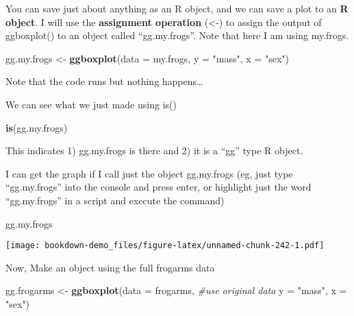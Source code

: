 \documentclass[]{book}
\newenvironment{Shaded}{\begin{snugshade}}{\end{snugshade}}
\newcommand{\KeywordTok}[1]{\textcolor[rgb]{0.13,0.29,0.53}{\textbf{#1}}}
\newcommand{\DataTypeTok}[1]{\textcolor[rgb]{0.13,0.29,0.53}{#1}}
\newcommand{\StringTok}[1]{\textcolor[rgb]{0.31,0.60,0.02}{#1}}
\newcommand{\CommentTok}[1]{\textcolor[rgb]{0.56,0.35,0.01}{\textit{#1}}}
\newcommand{\NormalTok}[1]{#1}
\theoremstyle{definition}
\theoremstyle{definition}
\theoremstyle{definition}
\theoremstyle{remark}
\begin{document}
You can save just about anything as an R object, and we can save a plot
to an \textbf{R object}. I will use the \textbf{assignment operation}
(\textless{}-) to assign the output of ggboxplot() to an object called
``gg.my.frogs''. Note that here I am using my.frogs.

\begin{Shaded}
\begin{Highlighting}[]
\NormalTok{gg.my.frogs <-}\StringTok{ }\KeywordTok{ggboxplot}\NormalTok{(}\DataTypeTok{data =}\NormalTok{ my.frogs,}
          \DataTypeTok{y =} \StringTok{"mass"}\NormalTok{,}
          \DataTypeTok{x =} \StringTok{"sex"}\NormalTok{)}
\end{Highlighting}
\end{Shaded}

Note that the code runs but nothing happens\ldots{}

We can see what we just made using is()

\begin{Shaded}
\begin{Highlighting}[]
\KeywordTok{is}\NormalTok{(gg.my.frogs)}
\end{Highlighting}
\end{Shaded}

This indicates 1) gg.my.frogs is there and 2) it is a ``gg'' type R
object.

I can get the graph if I call just the object gg.my.frogs (eg, just type
``gg.my.frogs'' into the console and press enter, or highlight just the
word ``gg.my.frogs'' in a script and execute the command)

\begin{Shaded}
\begin{Highlighting}[]
\NormalTok{gg.my.frogs}
\end{Highlighting}
\end{Shaded}

\texttt{[image: bookdown-demo\_files/figure-latex/unnamed-chunk-242-1.pdf]}

Now, Make an object using the full frogarms data

\begin{Shaded}
\begin{Highlighting}[]
\NormalTok{gg.frogarms <-}\StringTok{ }\KeywordTok{ggboxplot}\NormalTok{(}\DataTypeTok{data =}\NormalTok{ frogarms, }\CommentTok{#use original data}
          \DataTypeTok{y =} \StringTok{"mass"}\NormalTok{,}
          \DataTypeTok{x =} \StringTok{"sex"}\NormalTok{)}
\end{Highlighting}
\end{Shaded}
\end{document}
